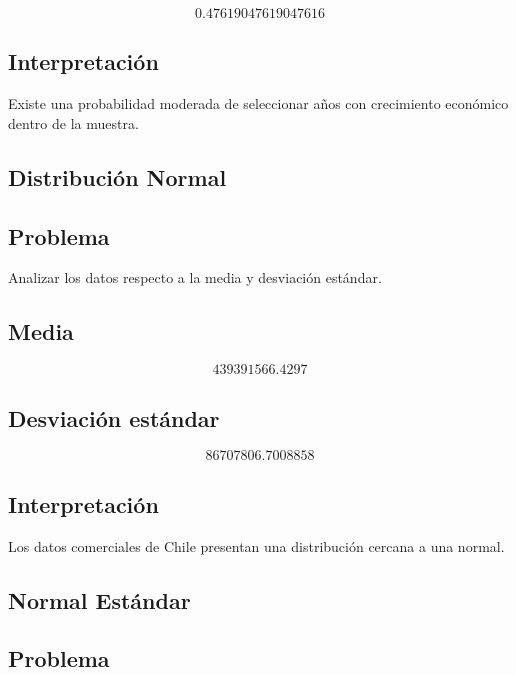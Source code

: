 \documentclass[12pt]{article}
\begin{document}
\[
0.47619047619047616
\]

\subsection*{Interpretación}

Existe una probabilidad moderada de seleccionar años con crecimiento económico dentro de la muestra.


\subsection{Distribución Normal}

\subsection*{Problema}

Analizar los datos respecto a la media y desviación estándar.

\subsection*{Media}

\[
439391566.4297
\]

\subsection*{Desviación estándar}

\[
86707806.7008858
\]

\subsection*{Interpretación}

Los datos comerciales de Chile presentan una distribución cercana a una normal.


\subsection{Normal Estándar}

\subsection*{Problema}
\end{document}
